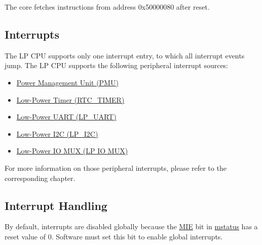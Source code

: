 \documentclass[main\_\_EN.tex]{subfiles}
\begin{document}
The core fetches instructions from address 0x50000080 after reset.

\subsection{Interrupts}\label{sec:ulp-intr}

The \chipname{} LP CPU supports only one interrupt entry, to which all interrupt events jump. The LP CPU supports the following peripheral interrupt sources:
\begin{itemize}
    \item \hyperref[mod:lowpowm]{Power Management Unit (PMU)}
    \item \hyperref[mod:lowpowm]{Low-Power Timer (RTC\_TIMER)}
    \item \hyperref[mod:uart]{Low-Power UART (LP\_UART)}
    \item \hyperref[mod:i2c]{Low-Power I2C (LP\_I2C)}
    \item \hyperref[mod:iomuxgpio]{Low-Power IO MUX (LP IO MUX)}
\end{itemize}

For more information on those peripheral interrupts, please refer to the corresponding chapter.

\subsection{Interrupt Handling}

By default, interrupts are disabled globally because the \hyperref[fielddesc:LPMSTATUSMIE]{MIE} bit in \hyperref[regdesc:LPMSTATUS]{mstatus} has a reset value of 0. Software must set this bit to enable global interrupts.
\end{document}
